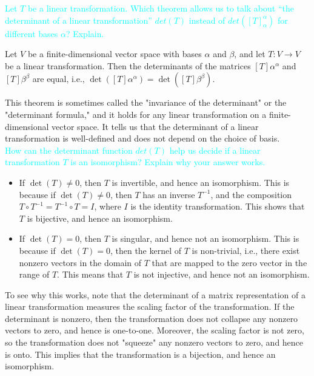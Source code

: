 \documentclass[fontsize=12pt]{scrartcl}
\begin{document}
\noindent
\textcolor{cyan}{Let $T$ be a linear transformation. Which theorem allows us to talk about ``the determinant of a linear transformation'' $det(T)$ instead of $det([T]_{\alpha}^{\alpha})$ for different bases $\alpha$? Explain.}

\noindent
Let $V$ be a finite-dimensional vector space with bases $\alpha$ and $\beta$, and let $T:V \rightarrow V$ be a linear transformation. Then the determinants of the matrices $[T]{\alpha}^{\alpha}$ and $[T]{\beta}^{\beta}$ are equal, i.e., $\det([T]{\alpha}^{\alpha}) = \det([T]{\beta}^{\beta})$.

\noindent
This theorem is sometimes called the "invariance of the determinant" or the "determinant formula," and it holds for any linear transformation on a finite-dimensional vector space. It tells us that the determinant of a linear transformation is well-defined and does not depend on the choice of basis.
\\

\noindent
\textcolor{cyan}{How can the determinant function $det(T)$ help us decide if a linear transformation $T$ is an isomorphism? Explain why your answer works.}

\begin{itemize}
	\item If $\det(T) \neq 0$, then $T$ is invertible, and hence an isomorphism. This is because if $\det(T) \neq 0$, then $T$ has an inverse $T^{-1}$, and the composition $T \circ T^{-1} = T^{-1} \circ T = I$, where $I$ is the identity transformation. This shows that $T$ is bijective, and hence an isomorphism.
	\item If $\det(T) = 0$, then $T$ is singular, and hence not an isomorphism. This is because if $\det(T) = 0$, then the kernel of $T$ is non-trivial, i.e., there exist nonzero vectors in the domain of $T$ that are mapped to the zero vector in the range of $T$. This means that $T$ is not injective, and hence not an isomorphism.
\end{itemize}

\noindent
To see why this works, note that the determinant of a matrix representation of a linear transformation measures the scaling factor of the transformation. If the determinant is nonzero, then the transformation does not collapse any nonzero vectors to zero, and hence is one-to-one. Moreover, the scaling factor is not zero, so the transformation does not "squeeze" any nonzero vectors to zero, and hence is onto. This implies that the transformation is a bijection, and hence an isomorphism.
\end{document}
